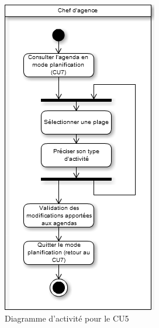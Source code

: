 \begin{figure}[H]
	\begin{center}
		\includegraphics[scale=0.4]{Includes/SOA-Activite-CU5.png}
		\caption{Diagramme d'activité pour le CU5}
	\end{center}
\end{figure}

